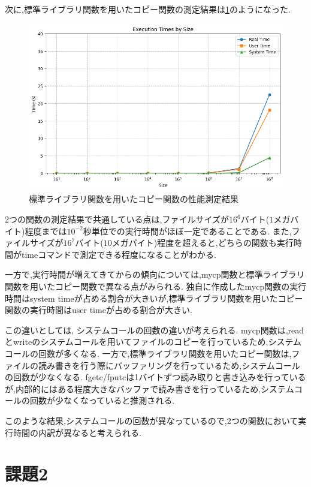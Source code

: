 \documentclass[autodetect-engine, dvi=dvipdfmx, 10pt, a4paper, ja=standard]{bxjsarticle}
\begin{document}
次に,標準ライブラリ関数を用いたコピー関数の測定結果は\ref{fig:ex-1-stdio}のようになった.

\begin{figure}[H]
	\centering
	\includegraphics[width=0.8\linewidth]{./syscp.png}
	\caption{標準ライブラリ関数を用いたコピー関数の性能測定結果}
	\label{fig:ex-1-stdio}
\end{figure}

2つの関数の測定結果で共通している点は,ファイルサイズが$16^6$バイト($1$メガバイト)程度までは$10^{-2}$秒単位での実行時間がほぼ一定であることである.
また,ファイルサイズが$16^7$バイト($10$メガバイト)程度を超えると,どちらの関数も実行時間がtimeコマンドで測定できる程度になることがわかる.

一方で,実行時間が増えてきてからの傾向については,mycp関数と標準ライブラリ関数を用いたコピー関数で異なる点がみられる.
独自に作成したmycp関数の実行時間はsystem timeが占める割合が大きいが,標準ライブラリ関数を用いたコピー関数の実行時間はuser timeが占める割合が大きい.

この違いとしては, システムコールの回数の違いが考えられる.
mycp関数は,readとwriteのシステムコールを用いてファイルのコピーを行っているため,システムコールの回数が多くなる.
一方で,標準ライブラリ関数を用いたコピー関数は,ファイルの読み書きを行う際にバッファリングを行っているため,システムコールの回数が少なくなる.
fgetc/fputcは1バイトずつ読み取りと書き込みを行っているが,内部的にはある程度大きなバッファで読み書きを行っているため,システムコールの回数が少なくなっていると推測される.

このような結果,システムコールの回数が異なっているので,2つの関数において実行時間の内訳が異なると考えられる.

\section{課題2}
\label{sec:ex-2}
\end{document}
